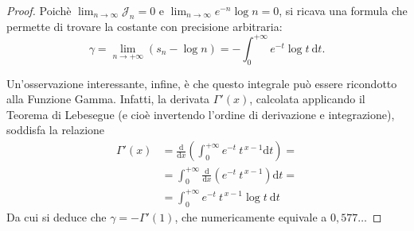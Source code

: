 \begin{proof}
	Poichè $ \lim_{n \to \infty} \mathcal{J}_n=0$ e $ \lim_{n \to \infty} e^{-n} \log n=0$, si ricava una formula che permette di trovare la costante con precisione arbitraria:
	\begin{equation*}
		\gamma= 
		\lim \limits_{n \to+ \infty}(s_n- \log n)=
		- \int^{+ \infty}_0e^{-t} \log t \: \mathrm{d}t.
	\end{equation*}

	Un'osservazione interessante, infine, è che questo integrale può essere ricondotto alla Funzione Gamma.	
	Infatti, la derivata $ \Gamma'(x)$, calcolata applicando il Teorema di Lebesegue (e cioè invertendo l'ordine di derivazione e integrazione), soddisfa la relazione
	\begin{align*}
		\Gamma'(x)&= 
		\frac{ \mathrm{d}}{ \mathrm{d}x} \left( \int^{+ \infty}_0e^{-t} \: t^{ \,x-1} \mathrm{d}t \right) = 
		\\ &= 
		\int^{+ \infty}_0 \frac{ \mathrm{d}}{ \mathrm{d}x} \left( e^{-t} \: t^{ \,x-1} \right) \mathrm{d}t= 
		\\ &= 
		\int^{+ \infty}_0e^{-t} \: t^{ \,x-1} \log t \: \mathrm{d}t
	\end{align*}
	Da cui si deduce che $ \gamma=- \Gamma'(1)$, che numericamente equivale a $0,577 \dots$
\end{proof}
\pagebreak